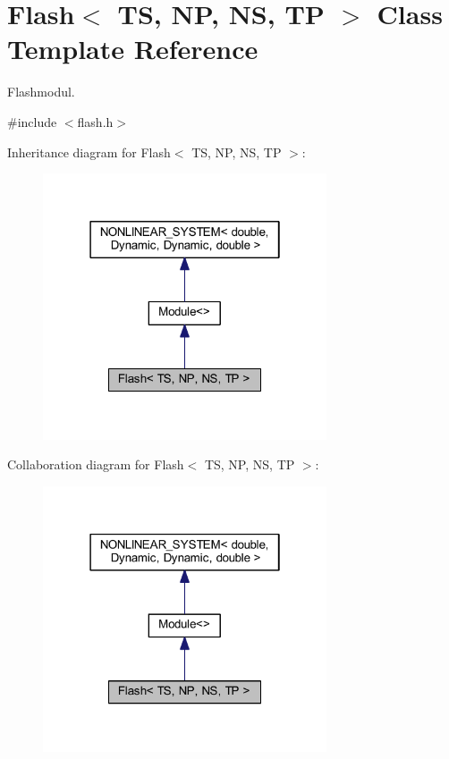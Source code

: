 \hypertarget{class_flash}{}\section{Flash$<$ TS, NP, NS, TP $>$ Class Template Reference}
\label{class_flash}


Flashmodul.  




{\ttfamily \#include $<$flash.\+h$>$}



Inheritance diagram for Flash$<$ TS, NP, NS, TP $>$\+:
\nopagebreak
\begin{figure}[H]
\begin{center}
\leavevmode
\includegraphics[width=238pt]{class_flash__inherit__graph}
\end{center}
\end{figure}


Collaboration diagram for Flash$<$ TS, NP, NS, TP $>$\+:
\nopagebreak
\begin{figure}[H]
\begin{center}
\leavevmode
\includegraphics[width=238pt]{class_flash__coll__graph}
\end{center}
\end{figure}
